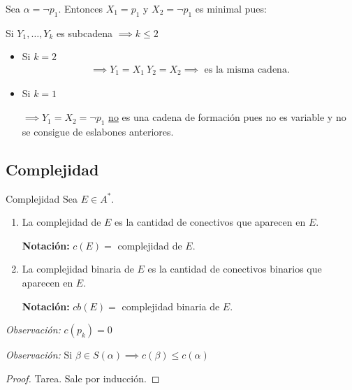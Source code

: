 Sea $\alpha = \neg p_1$. Entonces $X_1 = p_1$ y $X_2 = \neg p_1$ es minimal 
pues:

Si $Y_1, \dotsc, Y_k$ es subcadena $\implies k \leq 2$ 
%
\begin{itemize}
    \item Si $k = 2$
        \begin{gather*}
            \implies Y_1 = X_1 ~ Y_2 = X_2 
            \implies \text{ es la misma cadena.}
        \end{gather*}
    \item Si $k = 1$
        
        $\implies Y_1 = X_2 = \neg p_1$ 
        \underline{no} es una cadena de formación pues no es variable 
        y no se consigue de eslabones anteriores.
\end{itemize}



\subsection{Complejidad}

\begin{definicion}{Complejidad}{}
    Sea $E \in A^{*}$.

    \medskip

    \begin{enumerate}
        \item La complejidad de $E$ es la cantidad de conectivos que 
            aparecen en $E$.

            \bigskip
            \textbf{Notación:} \phantom{b}$c(E) =$ complejidad de $E$.
        \item La complejidad binaria de $E$ es la cantidad de conectivos
            binarios que aparecen en $E$.

            \bigskip
            \textbf{Notación:} $cb(E) =$ complejidad binaria de $E$.
    \end{enumerate}
\end{definicion}

\bigskip
\textit{Observación:}
$c(p_k) = 0$

\bigskip
\textit{Observación:}
%
Si $\beta \in S(\alpha) \implies c(\beta) \leq c(\alpha)$

\begin{proof}
    Tarea. Sale por inducción.
\end{proof}

